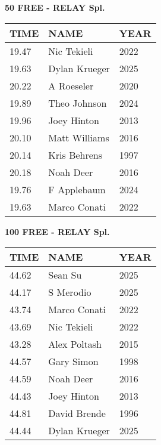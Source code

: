 \begin{table}[H]
\centering
\begin{minipage}[t]{0.6\textwidth}
\centering
\textbf{50 FREE - RELAY Spl.}\\[0.1cm]
\begin{tabular}{@{}p{1.8cm}p{2.8cm}p{1.2cm}@{}}
\hline
    \textbf{TIME} & \textbf{NAME} & \textbf{YEAR} \\
\hline
    19.47 & Nic Tekieli & 2022 \\
    19.63 & Dylan Krueger & 2025 \\
    20.22 & A Roeseler & 2020 \\
    19.89 & Theo Johnson & 2024 \\
    19.96 & Joey Hinton & 2013 \\
    20.10 & Matt Williams & 2016 \\
    20.14 & Kris Behrens & 1997 \\
    20.18 & Noah Deer & 2016 \\
    19.76 & F Applebaum & 2024 \\
    19.63 & Marco Conati & 2022 \\
\hline
\end{tabular}
\end{minipage}
\end{table}

\begin{table}[H]
\centering
\begin{minipage}[t]{0.6\textwidth}
\centering
\textbf{100 FREE - RELAY Spl.}\\[0.1cm]
\begin{tabular}{@{}p{1.8cm}p{2.8cm}p{1.2cm}@{}}
\hline
    \textbf{TIME} & \textbf{NAME} & \textbf{YEAR} \\
\hline
    44.62 & Sean Su & 2025 \\
    44.17 & S Merodio & 2025 \\
    43.74 & Marco Conati & 2022 \\
    43.69 & Nic Tekieli & 2022 \\
    43.28 & Alex Poltash & 2015 \\
    44.57 & Gary Simon & 1998 \\
    44.59 & Noah Deer & 2016 \\
    44.43 & Joey Hinton & 2013 \\
    44.81 & David Brende & 1996 \\
    44.44 & Dylan Krueger & 2025 \\
\hline
\end{tabular}
\end{minipage}
\end{table}

